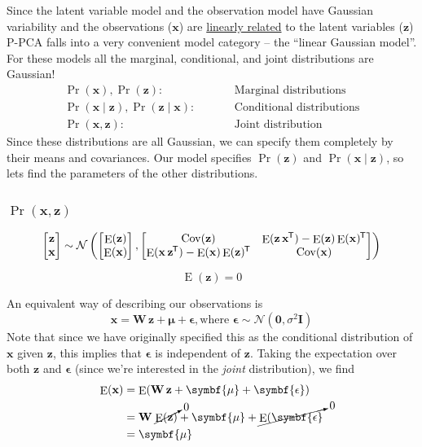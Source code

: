 \documentclass[11pt]{article}
\DeclareMathOperator{\E}{E}
\DeclareMathOperator{\Cov}{Cov}
\newcommand{\xb}{\mathbf{x}}
\newcommand{\zb}{\mathbf{z}}
\newcommand{\ub}{\symbf{\mu}}
\newcommand{\Wb}{\mathbf{W}}
\newcommand*{\tran}{^{\mkern-1.5mu\mathsf{T}}}
\begin{document}
Since the latent variable model and the observation model have Gaussian
variability and the observations ($\xb$) are \underline{linearly related} to the
latent variables ($\zb$) P-PCA falls into a very convenient model category --
the ``linear Gaussian  model''. For these models all the marginal, conditional,
and joint distributions are Gaussian!
\begin{equation*}
  \begin{aligned}
    \Pr(\xb), \Pr(\zb): & \quad && \text{Marginal distributions} \\
    \Pr(\xb \mid \zb), \Pr(\zb \mid \xb): & \quad && \text{Conditional distributions} \\
    \Pr(\xb, \zb):& \quad && \text{Joint distribution}
  \end{aligned}
\end{equation*}
Since these distributions are all Gaussian, we can specify them completely by
their means and covariances. Our model specifies $\Pr(\zb)$ and $\Pr(\xb \mid
\zb)$, so lets find the parameters of the other distributions.

\subsubsection{$\Pr(\xb,\zb)$}
\begin{equation*}
  \begin{bmatrix}\zb \\ \xb\end{bmatrix} \sim
    \mathcal{N}\left( \begin{bmatrix}\E(\zb) \\ \E(\xb)\end{bmatrix},
      \begin{bmatrix}\Cov(\zb) & \E(\zb \, \xb\tran) - \E(\zb)\E(\xb)\tran \\
                     \E(\xb \, \zb\tran) - \E(\xb)\E(\zb)\tran & \Cov(\xb)\end{bmatrix}
    \right)
\end{equation*}

\begin{equation*}
  \E(\zb) = 0 \tag*{From model specification}
\end{equation*}

An equivalent way of describing our observations is
\begin{equation}
  \xb = \Wb\, \zb + \ub + \symbf{\epsilon}, \text{where }
    \symbf{\epsilon} \sim \mathcal{N} (\mathbf{0}, \sigma^2 \mathbf{I})
  \label{eqn:lgModel}
\end{equation}
Note that since we have originally specified this as the conditional
distribution of $\xb$ given $\zb$, this implies that $\symbf{\epsilon}$ is
independent of $\zb$. Taking the expectation over both $\zb$ and
$\symbf{\epsilon}$ (since we're interested in the \textit{joint} distribution),
we find
\begin{align*}
  \E(\mathbf{x}) &= \E(\Wb\,\zb + \ub + \symbf{\epsilon}) \\
  &= \Wb\; \cancelto{0}{\E(\zb)} + \ub + \cancelto{0}{\E(\symbf{\epsilon}} \\
  &=\ub
\end{align*}
\end{document}
